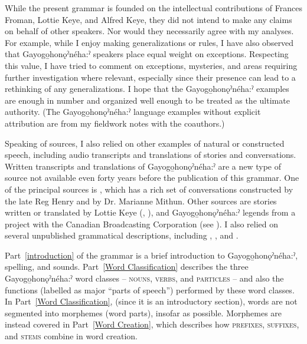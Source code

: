 While the present grammar is founded on the intellectual contributions of Frances Froman, Lottie Keye, and Alfred Keye, they did not intend to make any claims on behalf of other speakers. Nor would they necessarily agree with my analyses. For example, while I enjoy making generalizations or rules, I have also observed that Gayogo̱honǫˀnéha:ˀ speakers place equal weight on exceptions. Respecting this value, I have tried to comment on exceptions, mysteries, and areas requiring further investigation where relevant, especially since their presence can lead to a rethinking of any generalizations. I hope that the Gayogo̱honǫˀnéha:ˀ examples are enough in number and organized well enough to be treated as the ultimate authority. (The Gayogo̱honǫˀnéha:ˀ language examples without explicit attribution are from my fieldwork notes with the coauthors.)

Speaking of sources, I also relied on other examples of natural or constructed speech, including audio transcripts and translations of stories and conversations. Written transcripts and translations of Gayogo̱honǫˀnéha:ˀ are a new type of source not available even forty years before the publication of this grammar. One of the principal sources is \citet{mithun_watewayestanih_1984}, which has a rich set of conversations constructed by the late Reg Henry and by Dr. Marianne Mithun. Other sources are stories written or translated by Lottie Keye (\cite{keye_hnyagwaidatgigowah_2012}, \cite{keye_circle_2016}), and Gayogo̱honǫˀnéha:ˀ legends from a project with the Canadian Broadcasting Corporation (see \cite{carrier_legends_2013}). I also relied on several unpublished grammatical descriptions, including \citet{foster_course_1993}, \citet{sasse_far_1998}, and \citet{michelson_ontario_2011}.

Part~\ref{introduction} of the grammar is a brief introduction to Gayogo̱honǫˀnéha:ˀ, spelling, and sounds. Part~\ref{Word Classification} describes the three Gayogo̱honǫˀnéha:ˀ word classes – \textsc{nouns}, \textsc{verbs}, and \textsc{particles} – and also the functions (labelled as major “parts of speech”) performed by these word classes. In Part~\ref{Word Classification}, (since it is an introductory section), words are not segmented into morphemes (word parts), insofar as possible. Morphemes are instead covered in Part~\ref{Word Creation}, which describes how \textsc{prefixes}, \textsc{suffixes}, and \textsc{stems} combine in word creation. 


